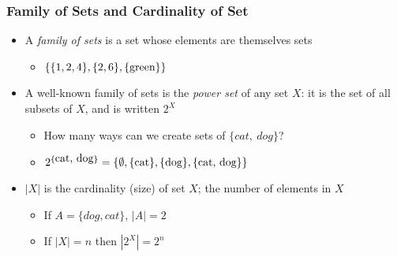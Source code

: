 \documentclass[aspectratio=169, handout]{beamer}
\newtheorem{defn}{Definition}
\numberwithin{equation}{section}
\begin{document}
\begin{frame}
\frametitle{Family of Sets and Cardinality of Set}

\begin{itemize}
\item A \textit{family of sets} is a set whose elements are themselves sets
\begin{itemize}
\item $\{\{1, 2, 4\}, \{2, 6\}, \{\hbox{green}\}\}$ \pause
\end{itemize}
\end{itemize}

\begin{itemize}
\item A well-known family of sets is the \textit{power set} of any set $X$: it is the set of all subsets of $X$, and is written $2^X$ 
\begin{itemize}
\item How many ways can we create sets of $\{cat,\ dog\}$? \pause
\item $2^{\{\hbox{cat, dog}\}}=\{\emptyset, \{\hbox{cat}\}, \{\hbox{dog}\}, \{\hbox{cat, dog}\}\}$ \pause
\end{itemize}
\end{itemize}

\begin{itemize}
\item $|X|$ is the cardinality (size) of set $X$; the number of elements in $X$
\begin{itemize}
\item If $A = \{dog, cat\}$, $|A| =2 $\pause
\item If $|X|=n$ then $|2^X|=2^n$
\end{itemize}
\end{itemize}

\end{frame}





\end{document}
